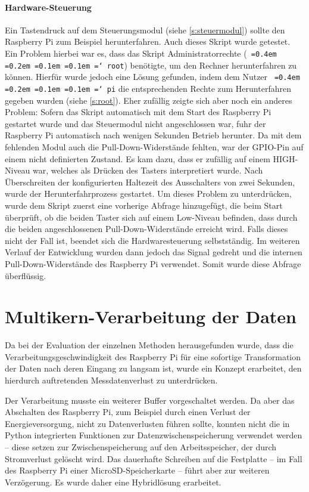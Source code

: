 \documentclass[a4paper,12pt,bibliography=totoc, listof=totoc,titlepage,pointlessnumbers]{scrreprt}
\newcommand*\justify{%
  \fontdimen2\font=0.4em%
  \fontdimen3\font=0.2em%
  \fontdimen4\font=0.1em%
  \fontdimen7\font=0.1em%
  \hyphenchar\font=`\-%
}
\newcommand{\code}[1]{\texttt{\justify{#1}}}
\begin{document}
\paragraph{Hardware-Steuerung}
Ein Tastendruck auf dem Steuerungsmodul (siehe \autoref{s:steuermodul}) sollte den Raspberry Pi zum Beispiel herunterfahren. Auch dieses Skript wurde getestet. Ein Problem hierbei war es, dass das Skript Administratorrechte (\code{root}) benötigte, um den Rechner herunterfahren zu können. Hierfür wurde jedoch eine Lösung gefunden, indem dem Nutzer \code{pi} die entsprechenden Rechte zum Herunterfahren gegeben wurden (siehe \autoref{s:root}). Eher zufällig zeigte sich aber noch ein anderes Problem: Sofern das Skript automatisch mit dem Start des Raspberry Pi gestartet wurde und das Steuermodul nicht angeschlossen war, fuhr der Raspberry Pi automatisch nach wenigen Sekunden Betrieb herunter. Da mit dem fehlenden Modul auch die Pull-Down-Widerstände fehlten, war der GPIO-Pin auf einem nicht definierten Zustand. Es kam dazu, dass er zufällig auf einem HIGH-Niveau war, welches als Drücken des Tasters interpretiert wurde. Nach Überschreiten der konfigurierten Haltezeit des Ausschalters von zwei Sekunden, wurde der Herunterfahrprozess gestartet. Um dieses Problem zu unterdrücken, wurde dem Skript zuerst eine vorherige Abfrage hinzugefügt, die beim Start überprüft, ob die beiden Taster sich auf einem Low-Niveau befinden, dass durch die beiden angeschlossenen Pull-Down-Widerstände erreicht wird. Falls dieses nicht der Fall ist, beendet sich die Hardwaresteuerung selbst\-stän\-dig. Im weiteren Verlauf der Entwicklung wurden dann jedoch das Signal gedreht und die internen Pull-Down-Widerstände des Raspberry Pi verwendet. Somit wurde diese Abfrage überflüssig.

\section{Multikern-Verarbeitung der Daten}
\label{s:multikern}
Da bei der Evaluation der einzelnen Methoden herausgefunden wurde, dass die Verarbeitungsgeschwindigkeit des Raspberry Pi für eine sofortige Transformation der Daten nach deren Eingang zu langsam ist, wurde ein Konzept erarbeitet, den hierdurch auftretenden Messdatenverlust zu unterdrücken.

Der Verarbeitung musste ein weiterer Buffer vorgeschaltet werden. Da aber das Abschalten des Raspberry Pi, zum Beispiel durch einen Verlust der Energieversorgung, nicht zu Datenverlusten führen sollte, konnten nicht die in Python integrierten Funktionen zur Datenzwischenspeicherung verwendet werden -- diese setzen zur Zwischenspeicherung auf den Arbeitsspeicher, der durch Stromverlust gelöscht wird. Das dauerhafte Schreiben auf die Festplatte -- im Fall des Raspberry Pi einer MicroSD-Speicherkarte -- führt aber zur weiteren Verzögerung. Es wurde daher eine Hybridlösung erarbeitet.
\end{document}
